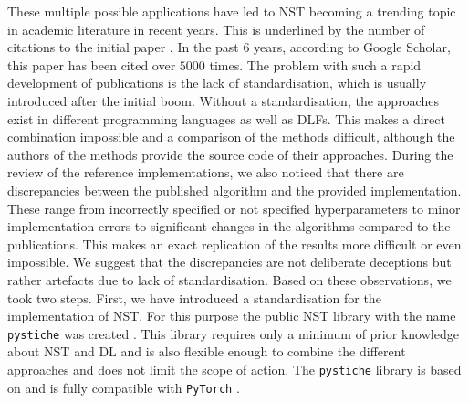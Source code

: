 These multiple possible applications have led to \gls{NST} becoming a trending topic in academic literature in recent years. This is underlined by the number of citations to the initial paper  \cite{GEB2016}. In the past $6$ years, according to Google Scholar, this paper has been cited over $5000$ times. The problem with such a rapid development of publications is the lack of standardisation, which is usually introduced after the initial boom. Without a standardisation, the approaches exist in different programming languages as well as \glspl{DLF}. This makes a direct combination impossible and a comparison of the methods difficult, although the authors of the methods provide the source code of their approaches. During the review of the reference implementations, we also noticed that there are discrepancies between the published algorithm and the provided implementation. These range from incorrectly specified or not specified hyperparameters to minor implementation errors to significant changes in the algorithms compared to the publications. This makes an exact replication of the results more difficult or even impossible. We suggest that the discrepancies are not deliberate deceptions but rather artefacts due to lack of standardisation. Based on these observations, we took two steps. First, we have introduced a standardisation for the implementation of \gls{NST}. For this purpose the public \gls{NST} library with the name \texttt{pystiche} was created \cite{ML2020}. This library requires only a minimum of prior knowledge about \gls{NST} and \gls{DL} and is also flexible enough to combine the different approaches and does not limit the scope of action. The \texttt{pystiche} library is based on and is fully compatible with \texttt{PyTorch} \cite{PGM+2019}. 


